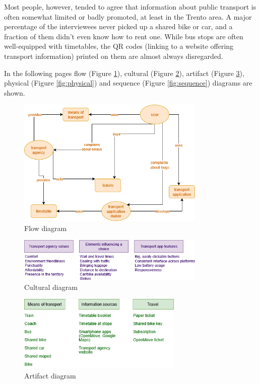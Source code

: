 \documentclass[11pt]{article}
\begin{document}
Most people, however, tended to agree that information about public transport is often somewhat limited or badly promoted, at least in the Trento area. A major percentage of the interviewees never picked up a shared bike or car, and a fraction of them didn't even know how to rent one. While bus stops are often well-equipped with timetables, the QR codes (linking to a website offering transport information) printed on them are almost always disregarded.

In the following pages flow (Figure \ref{fig:flow}), cultural (Figure \ref{fig:cultural}), artifact (Figure \ref{fig:artifact}), physical (Figure \ref{fig:physical}) and sequence (Figure \ref{fig:sequence}) diagrams are shown.

\begin{figure}[h!]
    \centering
    \includegraphics[width=0.8\textwidth]{drawable/diagrams/flow}
    \caption{Flow diagram}
    \label{fig:flow}
\end{figure}

\begin{figure}[h!]
    \centering
    \includegraphics[width=0.8\textwidth]{drawable/diagrams/culture}
    \caption{Cultural diagram}
    \label{fig:cultural}
\end{figure}

\begin{figure}[h!]
    \centering
    \includegraphics[width=0.7\textwidth]{drawable/diagrams/artifact}
    \caption{Artifact diagram}
    \label{fig:artifact}
\end{figure}
\end{document}
